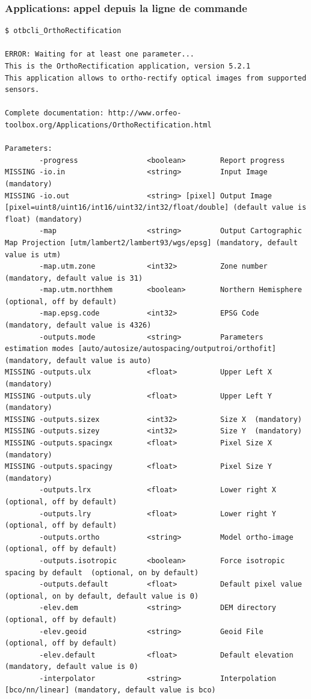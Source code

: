 \documentclass[8pt]{beamer}
\begin{document}
\begin{frame}[fragile]
\frametitle{Applications: appel depuis la ligne de commande}
\begin{scriptsize}
\vspace{-0.5cm}\begin{verbatim}
$ otbcli_OrthoRectification

ERROR: Waiting for at least one parameter...
This is the OrthoRectification application, version 5.2.1
This application allows to ortho-rectify optical images from supported sensors.

Complete documentation: http://www.orfeo-toolbox.org/Applications/OrthoRectification.html

Parameters:
        -progress                <boolean>        Report progress
MISSING -io.in                   <string>         Input Image  (mandatory)
MISSING -io.out                  <string> [pixel] Output Image  [pixel=uint8/uint16/int16/uint32/int32/float/double] (default value is float) (mandatory)
        -map                     <string>         Output Cartographic Map Projection [utm/lambert2/lambert93/wgs/epsg] (mandatory, default value is utm)
        -map.utm.zone            <int32>          Zone number  (mandatory, default value is 31)
        -map.utm.northhem        <boolean>        Northern Hemisphere  (optional, off by default)
        -map.epsg.code           <int32>          EPSG Code  (mandatory, default value is 4326)
        -outputs.mode            <string>         Parameters estimation modes [auto/autosize/autospacing/outputroi/orthofit] (mandatory, default value is auto)
MISSING -outputs.ulx             <float>          Upper Left X  (mandatory)
MISSING -outputs.uly             <float>          Upper Left Y  (mandatory)
MISSING -outputs.sizex           <int32>          Size X  (mandatory)
MISSING -outputs.sizey           <int32>          Size Y  (mandatory)
MISSING -outputs.spacingx        <float>          Pixel Size X  (mandatory)
MISSING -outputs.spacingy        <float>          Pixel Size Y  (mandatory)
        -outputs.lrx             <float>          Lower right X  (optional, off by default)
        -outputs.lry             <float>          Lower right Y  (optional, off by default)
        -outputs.ortho           <string>         Model ortho-image  (optional, off by default)
        -outputs.isotropic       <boolean>        Force isotropic spacing by default  (optional, on by default)
        -outputs.default         <float>          Default pixel value  (optional, on by default, default value is 0)
        -elev.dem                <string>         DEM directory  (optional, off by default)
        -elev.geoid              <string>         Geoid File  (optional, off by default)
        -elev.default            <float>          Default elevation  (mandatory, default value is 0)
        -interpolator            <string>         Interpolation [bco/nn/linear] (mandatory, default value is bco)
\end{verbatim}
\end{scriptsize}
\end{frame}
\end{document}
